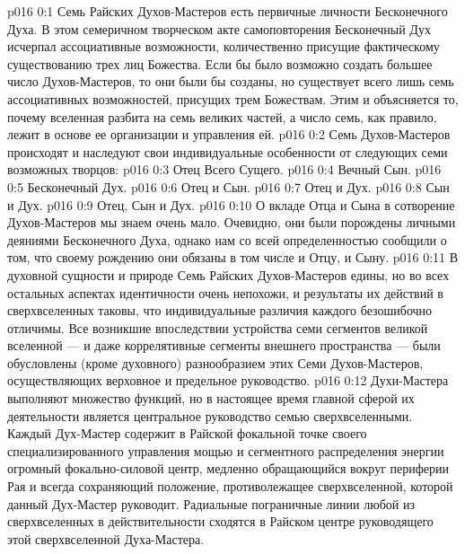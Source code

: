 \author{Вселенский Цензор}
\vs p016 0:1 Семь Райских Духов\hyp{}Мастеров есть первичные личности Бесконечного Духа. В этом семеричном творческом акте самоповторения Бесконечный Дух исчерпал ассоциативные возможности, количественно присущие фактическому существованию трех лиц Божества. Если бы было возможно создать большее число Духов\hyp{}Мастеров, то они были бы созданы, но существует всего лишь семь ассоциативных возможностей, присущих трем Божествам. Этим и объясняется то, почему вселенная разбита на семь великих частей, а число семь, как правило, лежит в основе ее организации и управления ей.
\vs p016 0:2 Семь Духов\hyp{}Мастеров происходят и наследуют свои индивидуальные особенности от следующих семи возможных творцов:
\vs p016 0:3 \bibnobreakspace Отец Всего Сущего.
\vs p016 0:4 \bibnobreakspace Вечный Сын.
\vs p016 0:5 \bibnobreakspace Бесконечный Дух.
\vs p016 0:6 \bibnobreakspace Отец и Сын.
\vs p016 0:7 \bibnobreakspace Отец и Дух.
\vs p016 0:8 \bibnobreakspace Сын и Дух.
\vs p016 0:9 \bibnobreakspace Отец, Сын и Дух.
\vs p016 0:10 \pc О вкладе Отца и Сына в сотворение Духов\hyp{}Мастеров мы знаем очень мало. Очевидно, они были порождены личными деяниями Бесконечного Духа, однако нам со всей определенностью сообщили о том, что своему рождению они обязаны в том числе и Отцу, и Сыну.
\vs p016 0:11 В духовной сущности и природе Семь Райских Духов\hyp{}Мастеров едины, но во всех остальных аспектах идентичности очень непохожи, и результаты их действий в сверхвселенных таковы, что индивидуальные различия каждого безошибочно отличимы. Все возникшие впоследствии устройства семи сегментов великой вселенной --- и даже коррелятивные сегменты внешнего пространства --- были обусловлены (кроме духовного) разнообразием этих Семи Духов\hyp{}Мастеров, осуществляющих верховное и предельное руководство.
\vs p016 0:12 Духи\hyp{}Мастера выполняют множество функций, но в настоящее время главной сферой их деятельности является центральное руководство семью сверхвселенными. Каждый Дух\hyp{}Мастер содержит в Райской фокальной точке своего специализированного управления мощью и сегментного распределения энергии огромный фокально\hyp{}силовой центр, медленно обращающийся вокруг периферии Рая и всегда сохраняющий положение, противолежащее сверхвселенной, которой данный Дух\hyp{}Мастер руководит. Радиальные пограничные линии любой из сверхвселенных в действительности сходятся в Райском центре руководящего этой сверхвселенной Духа\hyp{}Мастера.
